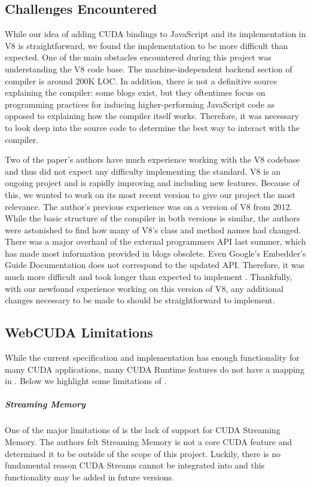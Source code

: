 

\subsection{Challenges Encountered} \label{challenges} While our idea of adding
CUDA bindings to JavaScript and its implementation in V8 is straightforward,
we found the implementation to be more difficult than expected.  One of the main obstacles
encountered during this project was understanding the V8 code base. The
machine-independent backend section of compiler is around 200K LOC. In addition,
there is not a definitive source explaining the compiler: some blogs exist, but
they oftentimes focus on programming practices for inducing higher-performing
JavaScript code as opposed to explaining how the compiler itself works.
Therefore, it was necessary to look deep into the source code to determine the
best way to interact with the compiler.

Two of the paper's authors have much experience working with the V8 codebase and
thus did not expect any difficulty implementing the \name standard. V8 is an
ongoing project and is rapidly improving and including new features. Because of
this, we wanted to work on its most recent version to give our project the most
relevance. The author's previous experience was on a version of V8 from 2012.
While the basic structure of the compiler in both versions is similar, the
authors were astonished to find how many of V8's class and method names had
changed. There was a major overhaul of the external programmers API last summer,
which has made most information provided in blogs obsolete. Even Google's
Embedder's Guide Documentation \cite{embeddersGuide} does not correspond to the
updated API.  Therefore, it was much more difficult and took longer than
expected to implement \name. Thankfully, with our newfound experience working on
this version of V8, any additional changes necessary to be made to \name should
be straightforward to implement.

\subsection{WebCUDA Limitations}
While the current \name specification and implementation has enough
functionality for many CUDA applications, many CUDA Runtime features do not
have a mapping in \namens. Below we highlight some limitations of \namens.

\subparagraph{Streaming Memory} One of the major limitations of \name is the
lack of support for CUDA Streaming Memory. The authors felt Streaming Memory is
not a core CUDA feature and determined it to be outside of the scope of this project.
Luckily, there is no fundamental reason CUDA Streams cannot be integrated into
\name and this functionality may be added in future versions.


